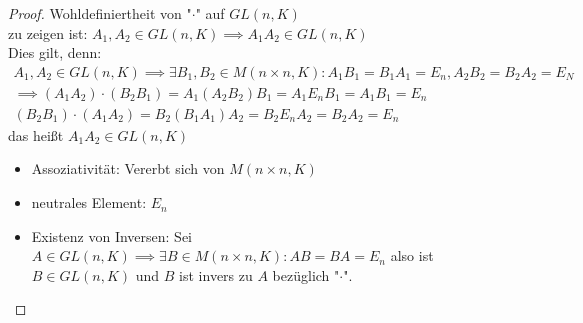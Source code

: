 \documentclass[a4paper]{scrartcl}
\DeclareMathOperator{\Exists}{\exists}
\theoremstyle{definition}
\theoremstyle{plain}
\theoremstyle{plain}
\theoremstyle{remark}
\theoremstyle{remark}
\theoremstyle{remark}
\theoremstyle{remark}
\theoremstyle{remark}
\begin{document}
\begin{proof}
Wohldefiniertheit von "$\cdot$" auf $GL(n, K)$ \\
  zu zeigen ist: $A_1, A_2 \in GL(n, K) \implies A_1 A_2 \in GL(n,K)$ \\
  Dies gilt, denn:
\begin{align*}
A_1, A_2 \in GL(n, K) \implies \Exists B_1, B_2 \in M(n\times n, K): A_1 B_1 = B_1 A_1 = E_n, A_2 B_2 = B_2 A_2 = E_N \\
\implies (A_1 A_2) \cdot (B_2 B_1) = A_1(A_2 B_2) B_1 = A_1 E_n B_1 = A_1 B_1 = E_n \\
(B_2 B_1) \cdot (A_1 A_2) = B_2 (B_1 A_1) A_2 = B_2 E_n A_2 = B_2 A_2 = E_n
\end{align*}
das heißt $A_1 A_2 \in GL(n,K)$
\begin{itemize}
\item Assoziativität: Vererbt sich von $M(n\times n, K)$
\item neutrales Element: $E_n$
\item Existenz von Inversen: Sei $A\in GL(n,K) \implies \Exists B\in M(n\times n, K): AB = BA = E_n$ also ist $B\in GL(n,K)$ und $B$ ist invers zu $A$ bezüglich "$\cdot$".
\end{itemize}
\end{proof}
\end{document}
